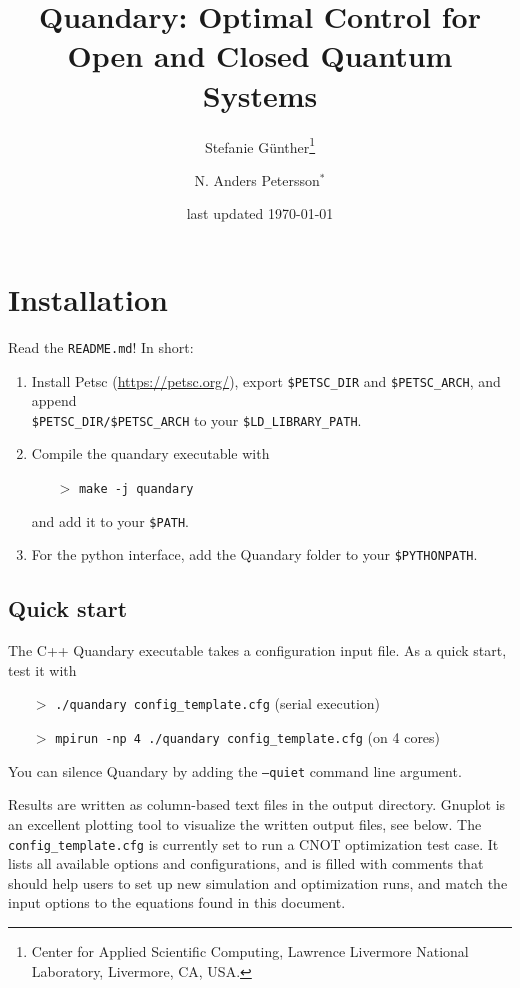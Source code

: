 \documentclass[11pt]{article}
\title{Quandary: Optimal Control for Open and Closed Quantum Systems}
\author{Stefanie G{\"u}nther\thanks{Center for Applied Scientific Computing, Lawrence Livermore National Laboratory, Livermore, CA, USA.} \and N. Anders Petersson$^*$}
\date{last updated \today}
\begin{document}
\maketitle


\section*{Installation}
 Read the \texttt{README.md}! In short:
 \begin{enumerate}
  \item Install Petsc (\url{https://petsc.org/}), export \texttt{\$PETSC\_DIR} and \texttt{\$PETSC\_ARCH}, and append \\[0ex] \texttt{\$PETSC\_DIR/\$PETSC\_ARCH} to your \texttt{\$LD\_LIBRARY\_PATH}. 
  \item Compile the quandary executable with 
  \begin{itemize}
    \item[$>$] \texttt{make -j quandary}
  \end{itemize}
  and add it to your \texttt{\$PATH}. 
  \item For the python interface, add the Quandary folder to your \texttt{\$PYTHONPATH}.
 \end{enumerate}

 
 \subsection*{Quick start} 
 
The C++ Quandary executable takes a configuration input file. As a quick start, test it with 
\begin{itemize}
  \item[$>$]  \texttt{./quandary config\_template.cfg}  \hfill (serial execution)
  \item[$>$]  \texttt{mpirun -np 4 ./quandary config\_template.cfg}  \hfill (on 4 cores)
\end{itemize}
You can silence Quandary by adding the \texttt{--quiet} command line argument.

Results are written as column-based text files in the output directory. Gnuplot is an excellent plotting tool to visualize the written output files, see below. The \texttt{config\_template.cfg} is currently set to run a CNOT optimization test case. It lists all available options and configurations, and is filled with comments that should help users to set up new simulation and optimization runs, and match the input options to the equations found in this document. 
\end{document}
